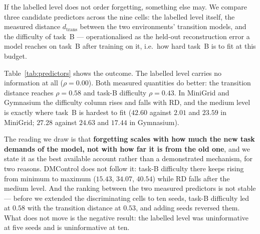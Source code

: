 If the labelled level does not order forgetting, something else may. We compare
three candidate predictors across the nine cells: the labelled level itself, the
measured distance $d_{\mathrm{trans}}$ between the two environments' transition
models, and the difficulty of task~B --- operationalised as the held-out
reconstruction error a model reaches on task~B after training on it, i.e.\ how
hard task~B is to fit at this budget.

\begin{table}[t]
  \centering
  
  \caption{The nine cells behind the rank correlations, and the correlations
  themselves. RD and task-B difficulty are aggregated as in
  Table~\ref{tab:axis}; $d_{\mathrm{trans}}$ is a property of the task pair and
  is the median over seeds.}
  \label{tab:predictors}
\end{table}

Table~\ref{tab:predictors} shows the outcome. The labelled level carries no
information at all ($\rho = 0.00$). Both measured quantities do better: the
transition distance reaches $\rho = 0.58$ and task-B difficulty $\rho = 0.43$.
In MiniGrid and Gymnasium the difficulty column rises and falls with RD, and
the medium level is exactly where task~B is hardest to fit ($42.60$ against
$2.01$ and $23.59$ in MiniGrid; $27.28$ against $24.63$ and $17.44$ in
Gymnasium).

The reading we draw is that \textbf{forgetting scales with how much the new task
demands of the model, not with how far it is from the old one}, and we state it
as the best available account rather than a demonstrated mechanism, for two
reasons. DMControl does not follow it: task-B difficulty there keeps rising from
minimum to maximum ($15.43$, $34.07$, $40.54$) while RD falls after the medium
level. And the ranking between the two measured predictors is not stable ---
before we extended the discriminating cells to ten seeds, task-B difficulty led
at $0.58$ with the transition distance at $0.53$, and adding seeds reversed
them. What does not move is the negative result: the labelled level was
uninformative at five seeds and is uninformative at ten.

